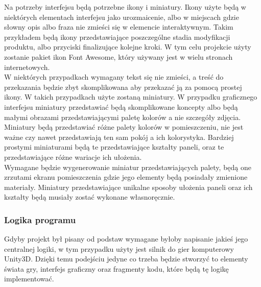 \documentclass{article} %
\begin{document}
            Na potrzeby interfejsu będą potrzebne ikony i miniatury. Ikony użyte będą w niektórych elementach interfejsu jako urozmaicenie, albo w miejscach gdzie słowny opis albo fraza nie zmieści się w elemencie interaktywnym. Takim przykładem będą ikony przedstawiające poszczególne stadia modyfikacji produktu, albo przyciski finalizujące kolejne kroki. W tym celu projekcie użyty zostanie pakiet ikon Font Awesome, który używany jest w wielu stronach internetowych.
            \\
        
            W niektórych przypadkach wymagany tekst się nie zmieści, a treść do przekazania będzie zbyt skomplikowana aby przekazać ją za pomocą prostej ikony. W takich przypadkach użyte zostaną miniatury. W przypadku graficznego interfejsu miniatury przedstawiać będą skomplikowane koncepty albo będą małymi obrazami przedstawiającymi paletę kolorów a nie szczegóły zdjęcia. Miniatury będą przedstawiać różne palety kolorów w pomieszczeniu, nie jest ważne czy nawet przedstawiają ten sam pokój a ich kolorystyka. Bardziej prostymi miniaturami będą te przedstawiające kształty paneli, oraz te przedstawiające różne wariacje ich ułożenia.
            \\
            
            Wymagane będzie wygenerowanie miniatur przedstawiających palety, będą one zrzutami ekranu pomieszczenia gdzie jego elementy będą posiadały zmienione materiały. Miniatury przedstawiające unikalne sposoby ułożenia paneli oraz ich kształty będą musiały zostać wykonane własnoręcznie.
            \\
            
            
            
            
            
            
            
            
            
            
            
            
            
        \subsubsection{Logika programu}
        Gdyby projekt był pisany od podstaw wymagane byłoby napisanie jakieś jego centralnej logiki, w tym przypadku użyty jest silnik do gier komputerowy Unity3D. Dzięki temu podejściu jedyne co trzeba będzie stworzyć to elementy świata gry, interfejs graficzny oraz fragmenty kodu, które będą tę logikę implementować.
        \\
        
\end{document}
